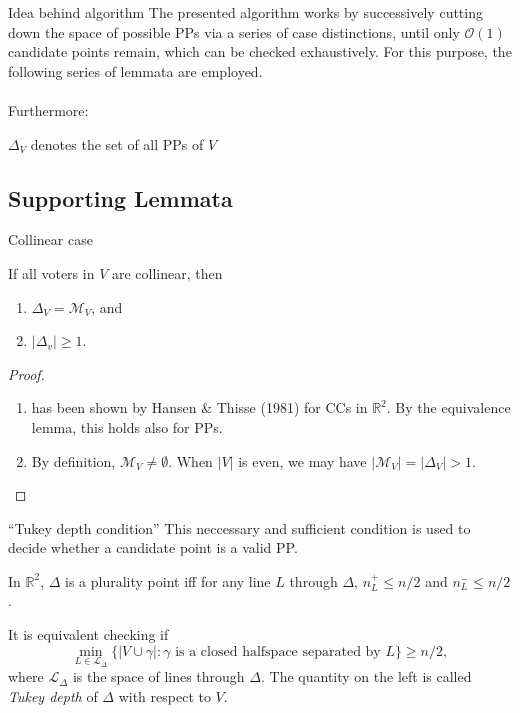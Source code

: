 \documentclass{beamer}
\newcommand{\RR}{\mathbb{R}}
\newcommand{\order}[1]{\ensuremath{\mathcal{O}(#1)}}
\newcommand{\eqspacing}[2]{%
  \setlength\abovedisplayskip{#1}%
  \setlength\belowdisplayskip{#2}%
}
\begin{document}
\begin{frame}{Idea behind algorithm}
  The presented algorithm works by successively cutting down the space of possible PPs via a series
  of case distinctions, until only \order{1} candidate points remain, which can be checked
  exhaustively. For this purpose, the following series of lemmata are employed. \\~\\

  Furthermore:
  \begin{definition}[]
    \(\Delta_V\) denotes the set of all PPs of \(V\)
  \end{definition}
\end{frame}


\subsection{Supporting Lemmata}

\begin{frame}{Collinear case} 
  \begin{lemma} %
    If all voters in \(V\) are collinear, then
    \begin{enumerate}
    \item \(\Delta_V = \mathcal{M}_V\), and
    \item \(\lvert\Delta_{v}\rvert \geq 1\).
    \end{enumerate}
  \end{lemma}
  \begin{proof}
    \begin{enumerate}
    \item has been shown by Hansen \& Thisse (1981) for CCs in \(\RR^2\). By the
      equivalence lemma, this holds also for PPs.
    \item By definition, \(\mathcal{M}_V \neq \emptyset\). When \(\lvert V\rvert\) is even, we may
      have \(\lvert\mathcal{M}_V\rvert = \lvert\Delta_V\rvert > 1\).
    \end{enumerate}
\end{proof}
\end{frame}


\begin{frame}{\enquote{Tukey depth condition}}
  This neccessary and sufficient condition is used to decide whether a candidate point is a valid
  PP.
  \begin{lemma}[]  %
    In \(\RR^2\), \(\Delta\) is a plurality point iff for any line \(L\) through \(\Delta\), \(n^+_L
    \leq n/2\) and \(n^-_L \leq n/2\). 
  \end{lemma}
  \eqspacing{1ex}{1ex}
  It is equivalent checking if
  \begin{equation*}
    \min_{L \in \mathcal{L}_{\Delta}} \{\lvert V \cup \gamma \rvert : \text{\(\gamma\) is a closed halfspace
      separated by \(L\)}\} \geq n/2,
  \end{equation*}
  where \(\mathcal{L}_{\Delta}\) is the space of lines through \(\Delta\). The quantity on the left
  is called \textit{Tukey depth} of \(\Delta\) with respect to \(V\).
\end{frame}
\end{document}

